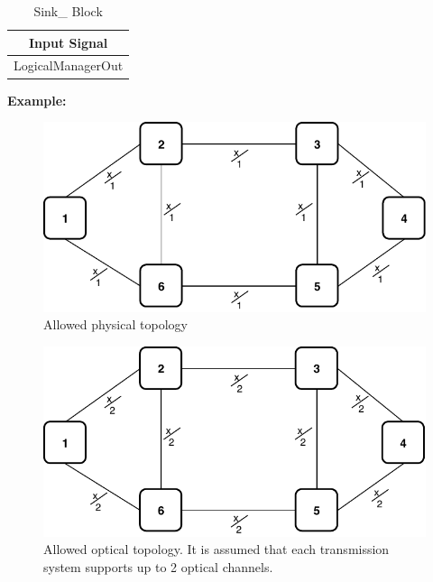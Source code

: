 \begin{table}[H]
	\centering
	\begin{tabular}{| c |}
		\hline
		\textbf{Input Signal}\\ \hline
		LogicalManagerOut        \\ \hline
	\end{tabular}
	\caption{Sink\_ Block}
	\label{sink_block}
\end{table}

\newpage
\vspace{11pt}

\textbf{Example:}

\begin{figure}[h!]
	\centering
	\includegraphics[width=13cm]{sdf/heuristic/opaque/figures/allowed_physical_ex}
	\caption{Allowed physical topology}
	\label{allowed_physical_ex}
\end{figure}


\begin{figure}[h!]
	\centering
	\includegraphics[width=13cm]{sdf/heuristic/opaque/figures/allowed_optical_ex}
	\caption{Allowed optical topology. It is assumed that each transmission system supports up to 2 optical channels.}
	\label{allowed_optical_ex}
\end{figure}

